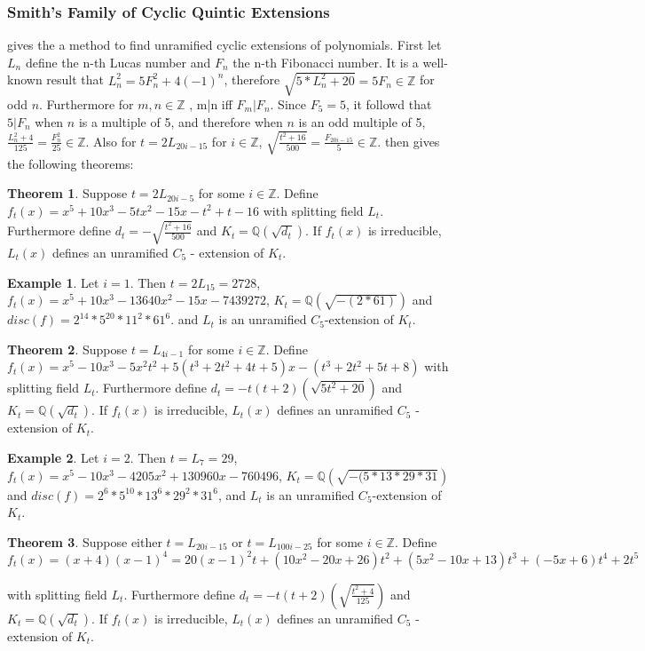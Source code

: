 \documentclass[12pt]{extarticle}
\newcommand{\Q}{\mathbb{Q}}
\newcommand{\Z}{\mathbb{Z}}
\newcommand{\<}{\langle}
\renewcommand{\>}{\rangle}
\theoremstyle{definition}
\newtheorem{theorem}{Theorem}
\newtheorem*{example}{Example}
\begin{document}
\subsubsection{Smith's Family of Cyclic Quintic Extensions}
\cite{SMITH} gives the a method to find unramified cyclic extensions of polynomials. First let $L_n$ define the n-th Lucas number and $F_n$ the n-th Fibonacci number. It is a well-known result that $L_n^2 = 5F_n^2+4(-1)^n$, therefore $\sqrt{5*L_n^2+20} = 5F_n \in \mathbb{Z}$ for odd $n$. Furthermore for $m,n \in \Z$ , m|n iff $F_m | F_n$. Since $F_5 = 5$, it followd that $5| F_n $ when $n$ is a multiple of 5, and therefore when $n$ is an odd multiple of 5, $\frac{L_n^2+4}{125} = \frac{F_n^2}{25} \in \Z$. Also for $t = 2L_{20i-15}$ for $i \in \Z$, $\sqrt{\frac{t^2+16}{500}} = \frac{F_{20i-15}}{5} \in \Z$. 
\cite{SMITH} then gives the following theorems:
\begin{theorem}
Suppose $t = 2L_{20i-5}$ for some $i \in \Z$. Define $f_t(x) = x^5 + 10x^3 - 5tx^2-15x-t^2+t-16$ with splitting field $L_t$. Furthermore define $d_t = -\sqrt{\frac{t^2+16}{500}}$ and $K_t = \Q(\sqrt{d_t})$. If $f_t(x)$ is irreducible, $L_t(x)$ defines an unramified $C_5$ - extension of $K_t$. 
\end{theorem}
\begin{example}
Let $i=1$. Then $t=2L_{15} = 2728$, $f_t(x) = x^5 + 10x^3 - 13640x^2 - 15x - 7439272$, $K_t = \Q(\sqrt{-(2*61)})$ and $disc(f) = 2^{14} * 5^{20} * 11^2 * 61^6$. and $L_t$ is an unramified $C_5$-extension of $K_t$. 
\end{example}
\begin{theorem}
Suppose $t = L_{4i-1}$ for some $i \in \Z$. Define $f_t(x) = x^5 -10x^3 - 5x^2t^2+5(t^3+2t^2+4t+5)x-(t^3+2t^2+5t+8)$ with splitting field $L_t$. Furthermore define $d_t = -t(t+2)(\sqrt{5t^2+20})$ and $K_t = \Q(\sqrt{d_t})$. If $f_t(x)$ is irreducible, $L_t(x)$ defines an unramified $C_5$ - extension of $K_t$.
\end{theorem}
\begin{example}
Let $i=2$. Then $t=L_{7} = 29$, $f_t(x) = x^5 - 10x^3 - 4205x^2 + 130960x - 760496$, $K_t = \Q(\sqrt{-( 5 * 13 * 29 * 31})$ and $disc(f) =2^6 * 5^{10} * 13^6 * 29^2 * 31^6$,  and $L_t$ is an unramified $C_5$-extension of $K_t$. 
\end{example}
\begin{theorem}
Suppose either $t = L_{20i-15}$ or $t = L_{100i-25}$ for some $i \in \Z$. Define $f_t(x) = (x+4)(x-1)^4 = 20(x-1)^2t + (10x^2-20x+26)t^2 + (5x^2-10x+13)t^3 +(-5x+6)t^4 + 2t^5$

 with splitting field $L_t$. Furthermore define $d_t = -t(t+2)\left(\sqrt{\frac{t^2+4}{125}}\right)$ and $K_t = \Q(\sqrt{d_t})$. If $f_t(x)$ is irreducible, $L_t(x)$ defines an unramified $C_5$ - extension of $K_t$. 
\end{theorem}
\end{document}
